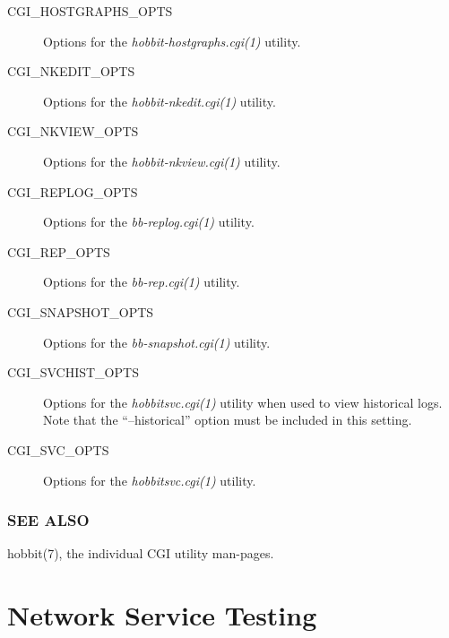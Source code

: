 \begin{description}
\item[CGI\_HOSTGRAPHS\_OPTS] Options for the \emph{hobbit-hostgraphs.cgi(1)}
 utility. 

 

\item[CGI\_NKEDIT\_OPTS] Options for the \emph{hobbit-nkedit.cgi(1)}
 utility. 

 

\item[CGI\_NKVIEW\_OPTS] Options for the \emph{hobbit-nkview.cgi(1)}
 utility. 

 

\item[CGI\_REPLOG\_OPTS] Options for the \emph{bb-replog.cgi(1)}
 utility. 

 

\item[CGI\_REP\_OPTS] Options for the \emph{bb-rep.cgi(1)}
 utility. 

 

\item[CGI\_SNAPSHOT\_OPTS] Options for the \emph{bb-snapshot.cgi(1)}
 utility. 

 

\item[CGI\_SVCHIST\_OPTS] Options for the \emph{hobbitsvc.cgi(1)}
 utility when used to view historical logs. Note that the ``--historical'' option must be included in this setting. 

 

\item[CGI\_SVC\_OPTS] Options for the \emph{hobbitsvc.cgi(1)}
 utility. 

 


\end{description}
\subsection{SEE ALSO}
hobbit(7), the individual CGI utility man-pages. 




%
\chapter{Network Service Testing}

%
